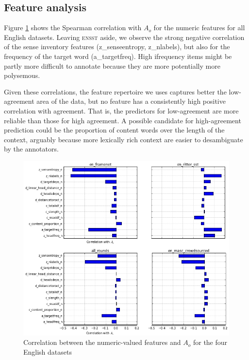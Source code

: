 \documentclass[11pt,a4paper]{article}
\begin{document}
%

%
%

\subsection{Feature analysis}
Figure \ref{fig:correlations} shows the Spearman correlation with $A_o$ for the numeric features for all English datasets. Leaving \textsc{ensst} aside, we observe the strong negative correlation of the sense inventory features (z\_senseentropy, z\_nlabels), but also for the frequency of the target word (a\_targetfreq). High ifrequency items might be partly more difficult to annotate because they are more potentially more polysemous. 

Given these correlations, the feature repertoire we uses captures better the low-agreement area of the data, but no feature has a consistently high positive correlation with agreement. That is, the predictors for low-agreement are more reliable than those for high agreement. A possible candidate for high-agreement prediction could be the proportion of content words over the length of the context, arguably because more lexically rich context are easier to desambiguate by the annotators.
\begin{figure}[htt]
\includegraphics[scale=0.3]{corrtable.jpg}

\caption{ \label{fig:correlations}Correlation between the numeric-valued features and $A_o$ for the four English datasets}    
\end{figure}
\end{document}
